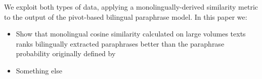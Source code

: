 \documentclass[11pt]{article}
\begin{document}

We exploit both types of data, applying a monolingually-derived similarity metric to the output of the pivot-based bilingual paraphrase model.  In this paper we:
\begin{itemize}
\item Show that monolingual cosine similarity calculated on large volumes texts ranks bilingually extracted paraphrases better than the paraphrase probability originally defined by 
\item Something else
\end{itemize}



%


\end{document}
